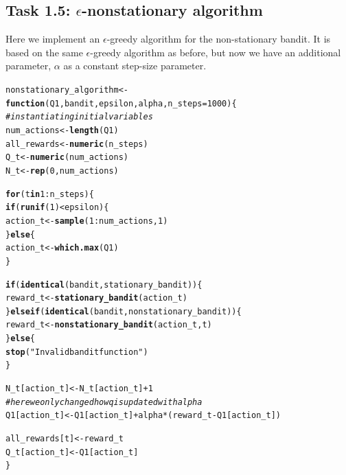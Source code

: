 \documentclass[10pt, a4paper, english]{article}\usepackage[]{graphicx}\usepackage[dvipsnames]{xcolor}
\makeatletter
\newcommand{\hlnum}[1]{\textcolor[rgb]{0.686,0.059,0.569}{#1}}%
\newcommand{\hlstr}[1]{\textcolor[rgb]{0.192,0.494,0.8}{#1}}%
\newcommand{\hlcom}[1]{\textcolor[rgb]{0.678,0.584,0.686}{\textit{#1}}}%
\newcommand{\hlopt}[1]{\textcolor[rgb]{0,0,0}{#1}}%
\newcommand{\hlstd}[1]{\textcolor[rgb]{0.345,0.345,0.345}{#1}}%
\newcommand{\hlkwa}[1]{\textcolor[rgb]{0.161,0.373,0.58}{\textbf{#1}}}%
\newcommand{\hlkwb}[1]{\textcolor[rgb]{0.69,0.353,0.396}{#1}}%
\newcommand{\hlkwc}[1]{\textcolor[rgb]{0.333,0.667,0.333}{#1}}%
\newcommand{\hlkwd}[1]{\textcolor[rgb]{0.737,0.353,0.396}{\textbf{#1}}}%
\newenvironment{kframe}{%
 \def\at@end@of@kframe{}%
 \ifinner\ifhmode%
  \def\at@end@of@kframe{\end{minipage}}%
  \begin{minipage}{\columnwidth}%
 \fi\fi%
 \def\FrameCommand##1{\hskip\@totalleftmargin \hskip-\fboxsep
 \colorbox{shadecolor}{##1}\hskip-\fboxsep
     \hskip-\linewidth \hskip-\@totalleftmargin \hskip\columnwidth}%
 \MakeFramed {\advance\hsize-\width
   \@totalleftmargin\z@ \linewidth\hsize
   \@setminipage}}%
 {\par\unskip\endMakeFramed%
 \at@end@of@kframe}
\newenvironment{knitrout}{}{} %
\makeatother
\begin{document}
\subsection{Task 1.5: $\epsilon$-nonstationary algorithm}
Here we implement an $\epsilon$-greedy algorithm for the non-stationary bandit. It is based on the same $\epsilon$-greedy algorithm as before, but now we have an additional parameter, $\alpha$ as a constant step-size parameter.
\begin{knitrout}
\color{fgcolor}\begin{kframe}
\begin{alltt}
\hlstd{nonstationary_algorithm} \hlkwb{<-} \hlkwa{function}\hlstd{(}\hlkwc{Q1}\hlstd{,} \hlkwc{bandit}\hlstd{,} \hlkwc{epsilon}\hlstd{,} \hlkwc{alpha}\hlstd{,} \hlkwc{n_steps}\hlstd{=}\hlnum{1000}\hlstd{) \{}
 \hlcom{#instantiating initial variables}
 \hlstd{num_actions} \hlkwb{<-} \hlkwd{length}\hlstd{(Q1)}
 \hlstd{all_rewards} \hlkwb{<-} \hlkwd{numeric}\hlstd{(n_steps)}
 \hlstd{Q_t} \hlkwb{<-} \hlkwd{numeric}\hlstd{(num_actions)}
 \hlstd{N_t} \hlkwb{<-}\hlkwd{rep}\hlstd{(}\hlnum{0}\hlstd{, num_actions)}

 \hlkwa{for} \hlstd{(t} \hlkwa{in} \hlnum{1}\hlopt{:}\hlstd{n_steps) \{}
   \hlkwa{if} \hlstd{(}\hlkwd{runif}\hlstd{(}\hlnum{1}\hlstd{)} \hlopt{<} \hlstd{epsilon) \{}
     \hlstd{action_t} \hlkwb{<-} \hlkwd{sample}\hlstd{(}\hlnum{1}\hlopt{:}\hlstd{num_actions,} \hlnum{1}\hlstd{)}
   \hlstd{\}} \hlkwa{else} \hlstd{\{}
     \hlstd{action_t} \hlkwb{<-} \hlkwd{which.max}\hlstd{(Q1)}
   \hlstd{\}}

     \hlkwa{if} \hlstd{(}\hlkwd{identical}\hlstd{(bandit, stationary_bandit)) \{}
     \hlstd{reward_t} \hlkwb{<-} \hlkwd{stationary_bandit}\hlstd{(action_t)}
   \hlstd{\}} \hlkwa{else if} \hlstd{(}\hlkwd{identical}\hlstd{(bandit, nonstationary_bandit)) \{}
     \hlstd{reward_t} \hlkwb{<-} \hlkwd{nonstationary_bandit}\hlstd{(action_t, t)}
   \hlstd{\}} \hlkwa{else} \hlstd{\{}
     \hlkwd{stop}\hlstd{(}\hlstr{"Invalid bandit function"}\hlstd{)}
   \hlstd{\}}

   \hlstd{N_t[action_t]} \hlkwb{<-} \hlstd{N_t[action_t]} \hlopt{+} \hlnum{1}
   \hlcom{#here we only changed how q is updated with alpha}
   \hlstd{Q1[action_t]} \hlkwb{<-} \hlstd{Q1[action_t]} \hlopt{+} \hlstd{alpha}\hlopt{*}\hlstd{(reward_t} \hlopt{-} \hlstd{Q1[action_t])}

   \hlstd{all_rewards[t]} \hlkwb{<-} \hlstd{reward_t}
   \hlstd{Q_t[action_t]} \hlkwb{<-} \hlstd{Q1[action_t]}
 \hlstd{\}}


\end{alltt}
\end{kframe}
\end{knitrout}
\end{document}
